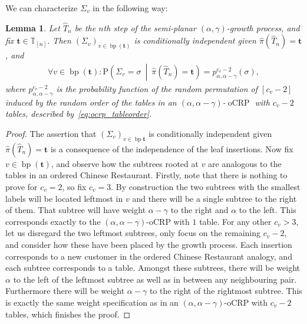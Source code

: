 \documentclass[a4paper, final]{amsart}
\theoremstyle{plain}
\newtheorem{lemma}[thm]{Lemma}
\theoremstyle{definition}
\newcommand{\tree}[1][t]{\boldsymbol{#1}}
\newcommand{\That}[1][T]{\widehat{#1}}
\newcommand{\T}{\mathbb{T}}
\DeclareMathOperator{\branchpoints}{bp}
\DeclareMathOperator{\ocrp}{oCRP}
\renewcommand{\P}{\mathrm{P}}
\begin{document}
\noindent
We can characterize $\Sigma_v$ in the following way:
%
\begin{lemma}
  \label{lemma:internalstructure}
  Let $\That_n$ be the $n$th step of the semi-planar $(\alpha, \gamma)$-growth process, and fix $\tree \in \T_{[n]}$.
  Then ${\left( \Sigma_v \right)}_{v \in \branchpoints(\tree)}$ is conditionally independent given $\hat{\pi} \left( \That_n \right) = \tree$, and 
  \begin{align}
    \forall v \in \branchpoints(\tree) \colon \P \left( \Sigma_v = \sigma \ \middle \vert \ \hat{\pi} \left( \That_n \right) = \tree \right) 
    = p^{c_v - 2}_{\alpha, \alpha - \gamma}( \sigma ),
    \label{eq:internalstructure}
  \end{align}
  where $p^{c_v - 2}_{\alpha, \alpha - \gamma}$ is the probability function of the random permutation of $[c_v-2]$ induced by the random order of the tables in an $(\alpha, \alpha - \gamma)$-$\ocrp$ with $c_v-2$ tables, described by~\eqref{eq:ocrp_tableorder}.
\end{lemma}
%
\begin{proof}
  The assertion that ${\left( \Sigma_v \right)}_{v \in \branchpoints{\tree}}$ is conditionally independent given $\hat{\pi} \left( \That_n \right) = \tree$ is a consequence of the independence of the leaf insertions.
  Now fix $v \in \branchpoints (\tree)$, and observe how the subtrees rooted at $v$ are analogous to the tables in an ordered Chinese Restaurant.
  Firstly, note that there is nothing to prove for $c_v = 2$, so fix $c_v = 3$.
  By construction the two subtrees with the smallest labels will be located leftmost in $v$ and there will be a single subtree to the right of them.
  That subtree will have weight $\alpha - \gamma$ to the right and $\alpha$ to the left.
  This corresponds exactly to the $(\alpha, \alpha - \gamma)$-oCRP with $1$ table.
  For any other $c_v > 3$, let us disregard the two leftmost subtrees, only focus on the remaining $c_v-2$, and consider how these have been placed by the growth process.
  Each insertion corresponds to a new customer in the ordered Chinese Restaurant analogy, and each subtree corresponds to a table.
  Amongst these subtrees, there will be weight $\alpha$ to the left of the leftmost subtree as well as in between any neighbouring pair.
  Furthermore there will be weight $\alpha - \gamma$ to the right of the rightmost subtree.
  This is exactly the same weight specification as in an $(\alpha, \alpha - \gamma)$-oCRP with $c_v-2$ tables, which finishes the proof.
\end{proof}
\end{document}
